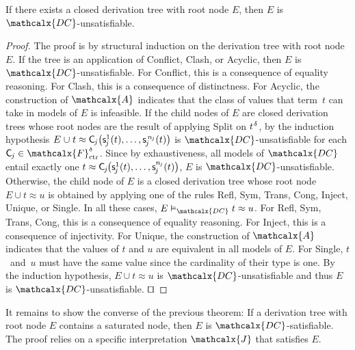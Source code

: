 \documentclass[smallcondensed,draft]{svjour3}
\newcommand\DISC[1]{t \teq \const{C}_{#1}\negvthinspace\bigl(\const s^1_{#1}( t ), \ldots,\const s^{n_{#1}}_{#1}( t )\bigr)}
\newcommand\typ[1]{^{\vthinspace #1}}
\newcommand\afterDot{\;} %
\newcommand\const[1]{\textsf{#1}}
\newcommand\xqed{{\hfill$\scriptstyle\squareforqed$}}
\newcommand{\Ec}{E}
\newcommand{\rn}[1]{\textsf{#1}}
\newcommand{\teq}{\approx}
\newcommand{\J}{\mathcalx{J}}
\newcommand{\Val}{\mathcalx{A}\vvthinspace}
\newcommand{\thD}{\mathcalx{DC}}
\newcommand\Funcs{\mathcalx{F}}
\newcommand\Ctr{\Funcs_{\smash{\mathrm{ctr}}}}
\newcommand\vvthinspace{\kern+0.041667em}
\newcommand\vthinspace{\kern+0.083333em}
\newcommand\negvthinspace{\kern-0.083333em}
\begin{document}
\begin{theorem}%
\label{thm:rs}%
\afterDot
If there exists a closed derivation tree with root node\/ $\Ec$, then\/ $\Ec$ is $\thD$-unsatisfiable.
\end{theorem}
\begin{proof}
The proof is by structural induction on the derivation tree with root node $\Ec$.
If the tree is an application of \rn{Conflict}, \rn{Clash}, or \rn{Acyclic},
then $\Ec$ is $\thD$-unsatisfiable.
For \rn{Conflict}, this is a consequence of equality reasoning.
For \rn{Clash}, this is a consequence of distinctness.
For \rn{Acyclic}, the construction of $\Val$ indicates that the class of values that term~$t$ can take in models of $\Ec$ is infeasible.
If the child nodes of $\Ec$ are closed derivation trees
whose root nodes are the result of applying \rn{Split} on $t\typ{\delta}$,
by the induction hypothesis $\Ec \mathrel\cup t \teq \smash{\const C_{\negvthinspace j}\bigl( \const s^1_{\negvthinspace j}( t ), \ldots, \const s^{\,\smash{n_{\negvthinspace j}}}_{\negvthinspace j}( t ) \bigr)}$ is
$\thD$-unsatisfiable
for each $\const C_{\negvthinspace j} \in \smash{\Ctr^\delta}$.
Since by exhaustiveness, all models of $\thD$ entail exactly one
$\DISC{\negvthinspace j}$,
$\Ec$ is $\thD$-unsatisfiable.
Otherwise, the child node of $\Ec$ is a closed derivation tree
whose root
node $\Ec \mathrel\cup t \teq u$ is obtained by applying one of the rules \rn{Refl}, \rn{Sym}, \rn{Trans}, \rn{Cong}, \rn{Inject}, \rn{Unique}, or \rn{Single}.
In all these cases, $\Ec \vDash_{\thD} t \teq u$.
For \rn{Refl}, \rn{Sym}, \rn{Trans}, \rn{Cong}, this is a consequence of equality reasoning.
For \rn{Inject}, this is a consequence of injectivity.
For \rn{Unique}, the construction of $\Val$ indicates that the values of $t$ and $u$ are equivalent in all models of $\Ec$.
For \rn{Single}, $t$~and~$u$ must have the same value since the cardinality of their type is one.
By the induction hypothesis, $\Ec \mathrel\cup t \teq u$ is $\thD$-unsatisfiable
and thus $\Ec$ is $\thD$-unsatisfiable.
\xqed
\end{proof}

It remains to show the converse of the previous theorem: If a derivation tree
with root node $\Ec$ contains a saturated node, then $\Ec$ is
$\thD$-satisfiable.
The proof relies on a specific interpretation $\J$ that satisfies $\Ec$.
\end{document}
